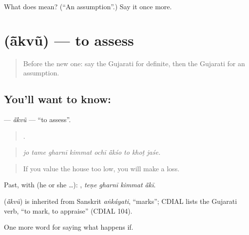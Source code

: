 \begin{tcolorbox}[breakable,colback=teal!4,colframe=teal!35!black,title={Before you move on}]
What does  mean? (\textquotedblleft{}An assumption\textquotedblright{}.) Say it once more.
\end{tcolorbox}
\section[\texorpdfstring{\gu{આંકવું} (ā̃kvũ)}{આંકવું (ā̃kvũ)}]{ (ā̃kvũ) — to assess}

\label{lesson:GU-C367-akvu}



\begin{quote}
Before the new one: say the Gujarati for definite, then the Gujarati for an assumption.
\end{quote}

\subsection*{You'll want to know: }
\textbf{} — \emph{ā̃kvũ} — \textquotedblleft{}to assess\textquotedblright{}.

\begin{quote}
        .
\end{quote}

\begin{quote}
\emph{jo tame gharnī kimmat ochī ā̃kśo to khoṭ jaśe.}
\end{quote}

\begin{quote}
If you value the house too low, you will make a loss.
\end{quote}

Past, with  (he or she …):    , \emph{teṇe gharnī kimmat ā̃kī}.

\begin{cousinweb}
\textbf{} (\emph{ā̃kvũ}) is inherited from Sanskrit \emph{aṅkáyati}, \textquotedblleft{}marks\textquotedblright{}; CDIAL lists the Gujarati verb, \textquotedblleft{}to mark, to appraise\textquotedblright{} (CDIAL 104).
\end{cousinweb}

\begin{grammarlens}[title={What you've built}]
One more word for saying what happens if.
\end{grammarlens}

